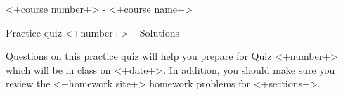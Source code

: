 
\medskip
\begin{center}
  <+course number+> - <+course name+>

  \Large Practice quiz <+number+>
  \ifprintanswers
    -- Solutions
  \els
  \fi
\end{center}
\hrulefill
\bigskip

Questions on this practice quiz will help you prepare for Quiz <+number+> which will be in class on <+date+>.
In addition, you should make sure you review the <+homework site+> homework problems for <+sections+>.


